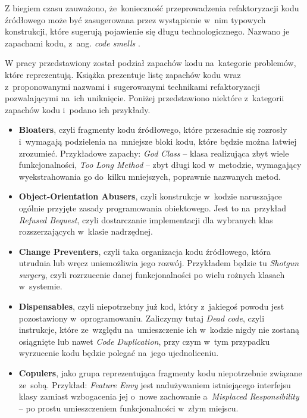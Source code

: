 \documentclass[twoside]{praca}
\begin{document}
Z biegiem czasu zauważono, że~konieczność przeprowadzenia refaktoryzacji kodu źródłowego może być zasugerowana przez wystąpienie w~nim typowych konstrukcji, które sugerują pojawienie się długu technologicznego. Nazwano je zapachami kodu, z~ang. \textit{code smells} \cite{mika2003taxonomy, martin2009clean}.

W pracy \cite{mika2003taxonomy} przedstawiony został podział zapachów kodu na~kategorie problemów, które reprezentują. Książka \cite{martin2009clean} prezentuje listę zapachów kodu wraz z~proponowanymi nazwami i~sugerowanymi technikami refaktoryzacji pozwalającymi na~ich uniknięcie. Poniżej przedstawiono niektóre z~kategorii zapachów kodu i~podano ich przykłady.

\begin{itemize}
    \item \textbf{Bloaters}, czyli fragmenty kodu źródłowego, które przesadnie się rozrosły i~wymagają podzielenia na~mniejsze bloki kodu, które będzie można łatwiej zrozumieć. Przykładowe zapachy: \textit{God Class} -- klasa realizująca zbyt wiele funkcjonalności, \textit{Too Long Method} -- zbyt długi kod w~metodzie, wymagający wyekstrahowania go do~kilku mniejszych, poprawnie nazwanych metod.
    \item \textbf{Object-Orientation Abusers}, czyli konstrukcje w~kodzie naruszające ogólnie przyjęte zasady programowania obiektowego. Jest to na~przykład \textit{Refused Bequest}, czyli dostarczanie implementacji dla wybranych klas rozszerzających w~klasie nadrzędnej.
    \item \textbf{Change Preventers}, czyli taka organizacja kodu źródłowego, która utrudnia lub wręcz uniemożliwia jego rozwój. Przykładem będzie tu \textit{Shotgun surgery}, czyli rozrzucenie danej funkcjonalności po wielu rożnych klasach w~systemie.
    \item \textbf{Dispensables}, czyli niepotrzebny już kod, który z~jakiegoś powodu jest pozostawiony w~oprogramowaniu. Zaliczymy tutaj \textit{Dead code}, czyli instrukcje, które ze~względu na~umieszczenie ich w~kodzie nigdy nie zostaną osiągnięte lub nawet \textit{Code Duplication}, przy czym w~tym przypadku wyrzucenie kodu będzie polegać na~jego ujednoliceniu.
    \item \textbf{Copulers}, jako grupa reprezentująca fragmenty kodu niepotrzebnie związane ze~sobą. Przykład: \textit{Feature Envy} jest nadużywaniem istniejącego interfejsu klasy zamiast wzbogacenia jej o~nowe zachowanie a~\textit{Misplaced Responsibility} -- po prostu umieszczeniem funkcjonalności w~złym miejscu.
\end{itemize}
\end{document}
